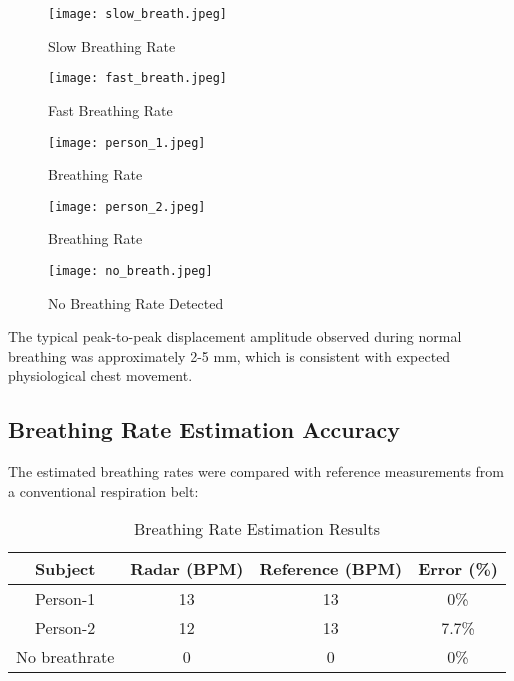 \documentclass[12pt]{article}
\begin{document}
\begin{figure}[H]
\centering
\texttt{[image: slow\_breath.jpeg]} %
\caption{Slow Breathing Rate}
\end{figure}

\begin{figure}[H]
\centering
\texttt{[image: fast\_breath.jpeg]} %
\caption{Fast Breathing Rate}
\end{figure}

\begin{figure}[H]
\centering
\texttt{[image: person\_1.jpeg]} %
\caption{Breathing Rate}
\end{figure}


\begin{figure}[H]
\centering
\texttt{[image: person\_2.jpeg]} %
\caption{Breathing Rate}
\end{figure}

\begin{figure}[H]
\centering
\texttt{[image: no\_breath.jpeg]} %
\caption{No Breathing Rate Detected}
\end{figure}




The typical peak-to-peak displacement amplitude observed during normal breathing was approximately 2-5 mm, which is consistent with expected physiological chest movement.

\subsection{Breathing Rate Estimation Accuracy}
The estimated breathing rates were compared with reference measurements from a conventional respiration belt:

\begin{table}[H]
\centering
\begin{tabular}{|c|c|c|c|}
\hline
\textbf{Subject} & \textbf{Radar (BPM)} & \textbf{Reference (BPM)} & \textbf{Error (\%)} \\
\hline
Person-1 & 13 & 13 & 0\% \\
Person-2 & 12 & 13 & 7.7\% \\
No breathrate & 0 & 0 & 0\% \\
\hline
\end{tabular}
\caption{Breathing Rate Estimation Results}
\end{table}
\end{document}
